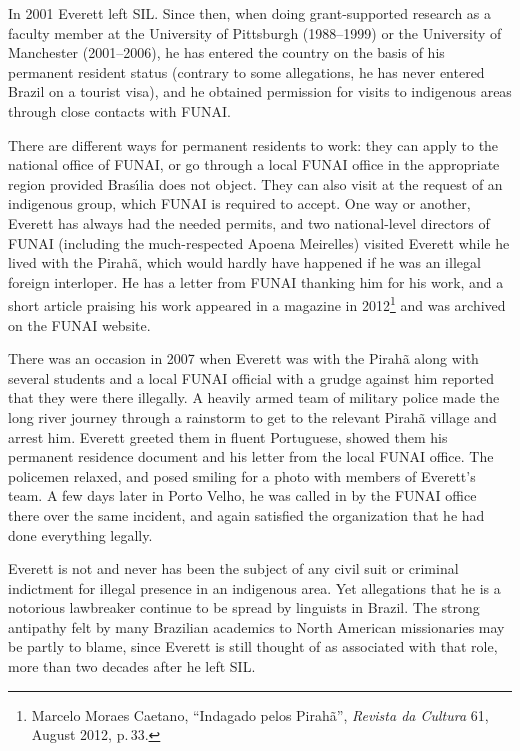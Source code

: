 \documentclass[output=paper,colorlinks,citecolor=brown
]{langscibook}
\begin{document}
In 2001 Everett left SIL. Since then, when doing grant-supported research
as a faculty member at the University of Pittsburgh (1988--1999) or
the University of Manchester (2001--2006), he has entered the country
on the basis of his permanent resident status (contrary to some
allegations, he has never entered Brazil on a tourist visa), and he
obtained permission for visits to indigenous areas through
close contacts with FUNAI.

There are different ways for permanent residents to work: they can apply
to the national office of FUNAI, or go through a local FUNAI office in
the appropriate region provided Bras{\'\i}lia does not object. They can
also visit at the request of an indigenous group, which FUNAI is required
to accept. One way or another, Everett has always had the needed permits,
and two national-level directors of FUNAI (including the much-respected
Apoena Meirelles) visited Everett while he lived with the Pirah{\~a},
which would hardly have happened if he was an illegal foreign
interloper. He has a letter from FUNAI thanking him for his work,
and a short article praising his work
appeared in a magazine in 2012\footnote{\label{caetano}%
Marcelo Moraes Caetano, ``Indagado pelos Pirah{\~a}'', \textit{Revista
da Cultura} 61, August 2012, p.\,33.}
and was archived on the FUNAI website.

There was an occasion in 2007 when Everett was with the Pirah{\~a}
along with several students and a local FUNAI official with a grudge
against him reported that they were there illegally. A heavily armed
team of military police made the long river journey through a rainstorm
to get to the relevant Pirah{\~a} village and arrest him. Everett greeted
them in fluent Portuguese, showed them his permanent residence document
and his letter from the local FUNAI office. The policemen relaxed, and
posed smiling for a photo with members of Everett's team.
A few days later in Porto Velho, he was called in by the FUNAI office
there over the same incident, and again satisfied the organization that
he had done everything legally.

Everett is not and never has been the subject of any civil suit or
criminal indictment for illegal presence in an indigenous area. Yet
allegations that he is a notorious lawbreaker continue to be spread
by linguists in Brazil. The strong antipathy felt by many Brazilian
academics to North American missionaries may be partly to blame, since
Everett is still thought of as associated with that role, more than
two decades after he left SIL.
\end{document}
